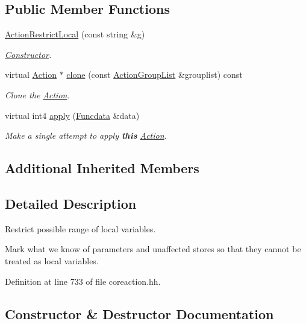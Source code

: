 \subsection*{Public Member Functions}
\begin{DoxyCompactItemize}
\item 
\mbox{\hyperlink{class_action_restrict_local_a787620aa597a3b7d8baffd07bbdfae21}{Action\+Restrict\+Local}} (const string \&g)
\begin{DoxyCompactList}\small\item\em \mbox{\hyperlink{class_constructor}{Constructor}}. \end{DoxyCompactList}\item 
virtual \mbox{\hyperlink{class_action}{Action}} $\ast$ \mbox{\hyperlink{class_action_restrict_local_a8e1551beb973dfdb3e8bede8903f9607}{clone}} (const \mbox{\hyperlink{class_action_group_list}{Action\+Group\+List}} \&grouplist) const
\begin{DoxyCompactList}\small\item\em Clone the \mbox{\hyperlink{class_action}{Action}}. \end{DoxyCompactList}\item 
virtual int4 \mbox{\hyperlink{class_action_restrict_local_acd58fcc24c2a2c8f7dc0d07e3d2c9cfc}{apply}} (\mbox{\hyperlink{class_funcdata}{Funcdata}} \&data)
\begin{DoxyCompactList}\small\item\em Make a single attempt to apply {\bfseries{this}} \mbox{\hyperlink{class_action}{Action}}. \end{DoxyCompactList}\end{DoxyCompactItemize}
\subsection*{Additional Inherited Members}


\subsection{Detailed Description}
Restrict possible range of local variables. 

Mark what we know of parameters and unaffected stores so that they cannot be treated as local variables. 

Definition at line 733 of file coreaction.\+hh.



\subsection{Constructor \& Destructor Documentation}
\mbox{\label{class_action_restrict_local_a787620aa597a3b7d8baffd07bbdfae21}} 
